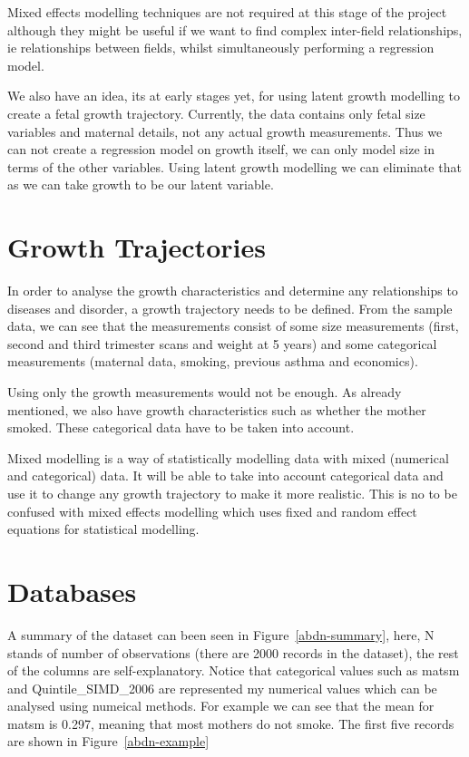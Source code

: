 \documentclass[bsc]{abdnthesis}
\begin{document}
Mixed effects modelling techniques are not required at this stage of the project although they might be useful if we want to find complex inter-field relationships, ie relationships between fields, whilst simultaneously performing a regression model. 

We also have an idea, its at early stages yet, for using latent growth modelling to create a fetal growth trajectory. Currently, the data contains only fetal size variables and maternal details, not any actual growth measurements. Thus we can not create a regression model on growth itself, we can only model size in terms of the other variables. Using latent growth modelling we can eliminate that as we can take growth to be our latent variable. 
\section{Growth Trajectories} %
\label{sec:growth_trajectories}
In order to analyse the growth characteristics and determine any relationships to diseases and disorder, a growth trajectory needs to be defined. From the sample data, we can see that the measurements consist of some size measurements (first, second and third trimester scans and weight at 5 years) and some categorical measurements (maternal data, smoking, previous asthma and economics). 


Using only the growth measurements would not be enough. As already mentioned, we also have growth characteristics such as whether the mother smoked. These categorical data have to be taken into account. 

Mixed modelling is a way of statistically modelling data with mixed (numerical and categorical) data. It will be able to take into account categorical data and use it to change any growth trajectory to make it more realistic. This is no to be confused with mixed effects modelling which uses fixed and random effect equations for statistical modelling. 
\section{Databases} %
\label{sec:databases}
A summary of the dataset can been seen in Figure~\ref{abdn-summary}, here, N stands of number of observations (there are 2000 records in the dataset), the rest of the columns are self-explanatory. Notice that categorical values such as matsm and Quintile\_SIMD\_2006 are represented my numerical values which can be analysed using numeical methods. For example we can see that the mean for matsm is 0.297, meaning that most mothers do not smoke. The first five records are shown in Figure~\ref{abdn-example}
\end{document}
